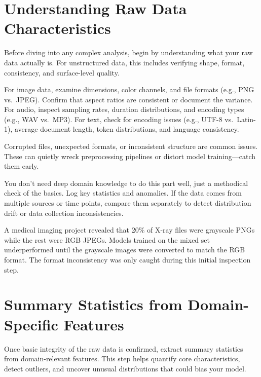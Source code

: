 \documentclass[12pt,openany, draft]{book}
\begin{document}
\section{Understanding Raw Data Characteristics}

Before diving into any complex analysis, begin by understanding what your raw data actually is. For unstructured data, this includes verifying shape, format, consistency, and surface-level quality.
\newline

For image data, examine dimensions, color channels, and file formats (e.g., PNG vs.\ JPEG). Confirm that aspect ratios are consistent or document the variance. For audio, inspect sampling rates, duration distributions, and encoding types (e.g., WAV vs.\ MP3). For text, check for encoding issues (e.g., UTF-8 vs.\ Latin-1), average document length, token distributions, and language consistency.
\newline

Corrupted files, unexpected formats, or inconsistent structure are common issues. These can quietly wreck preprocessing pipelines or distort model training—catch them early.
\newline

You don’t need deep domain knowledge to do this part well, just a methodical check of the basics. Log key statistics and anomalies. If the data comes from multiple sources or time points, compare them separately to detect distribution drift or data collection inconsistencies.

\begin{examplebox}
A medical imaging project revealed that 20\% of X-ray files were grayscale PNGs while the rest were RGB JPEGs. Models trained on the mixed set underperformed until the grayscale images were converted to match the RGB format. The format inconsistency was only caught during this initial inspection step.
\end{examplebox}


\section{Summary Statistics from Domain-Specific Features}

Once basic integrity of the raw data is confirmed, extract summary statistics from domain-relevant features. This step helps quantify core characteristics, detect outliers, and uncover unusual distributions that could bias your model.
\newline
\end{document}
